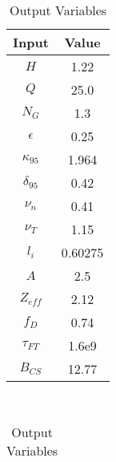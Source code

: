 \begin{table}[h!]
\centering  
\caption{Act II Variables}
\hfill
\begin{subtable}[t]{0.4\textwidth}
\centering  
\caption{Input Variables} ~\\
\begin{tabular}{ c|c } 

Input            & Value           \\
\hline
$H$              & 1.22            \\
$Q$              & 25.0            \\
$N_{G}$          & 1.3             \\
$\epsilon$       & 0.25            \\
$\kappa_{95}$    & 1.964           \\
$\delta_{95}$    & 0.42            \\
$\nu_{n}$        & 0.41            \\
$\nu_{T}$        & 1.15            \\
$l_{i}$          & 0.60275         \\
$A$              & 2.5             \\
$Z_{eff}$        & 2.12            \\
$f_{D}$          & 0.74            \\
$\tau_{FT}$      & 1.6e9           \\
$B_{CS}$         & 12.77           \\

\end{tabular}
\end{subtable}
\hfill
\begin{subtable}[t]{0.5\textwidth}
\centering  
\caption{Output Variables} ~\\
\begin{tabular}{ c|c|c } 


\end{tabular}
\end{subtable}
\end{table}

